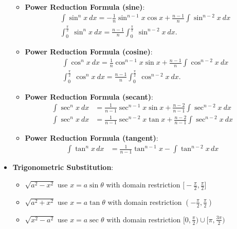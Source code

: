\documentclass{report}
\begin{document}
\begin{itemize}
\begin{itemize}
                \item \textbf{Power Reduction Formula (sine)}:
                    \begin{align*}
                        &\int \sin^{n}{x}\ dx = -\frac{1}{n}\sin^{n-1}{x}\cos{x} + \frac{n-1}{n}\int \sin^{n-2}{x}\ dx \\
                        &\int_{0}^{\frac{\pi}{2}}\ \sin^{n}{x}\ dx = \frac{n-1}{n}\int_{0}^{\frac{\pi}{2}}\ \sin^{n-2}{x}\ dx
                    .\end{align*}
                \item \textbf{Power Reduction Formula (cosine)}:
                    \begin{align*}
                        &\int \cos^{n}{x}\ dx = \frac{1}{n}\cos^{n-1}{x}\sin{x} + \frac{n-1}{n}\int \cos^{n-2}{x}\ dx \\
                        &\int_{0}^{\frac{\pi}{2}}\ \cos^{n}{x}\ dx = \frac{n-1}{n}\int_{0}^{\frac{\pi}{2}}\ \cos^{n-2}{x}\ dx
                    .\end{align*}
                \item \textbf{Power Reduction Formula (secant)}:
                    \begin{align*}
                        \int \sec^{n}{x}\ dx &= \frac{1}{n-1}\sec^{n-1}{x}\sin{x}+\frac{n-2}{n-1}\int \sec^{n-2}{x}\ dx \\
                        \int \sec^{n}{x}\ dx &= \frac{1}{n-1}\sec^{n-2}{x}\tan{x}+\frac{n-2}{n-1}\int \sec^{n-2}{x}\ dx
                    \end{align*}

                \item \textbf{Power Reduction Formula (tangent)}:
                    \begin{align*}
                        \int \tan^n x \, dx &= \frac{1}{n-1} \tan^{n-1}x - \int \tan^{n-2}x \, dx
                    \end{align*}
            \end{itemize}
        \item \textbf{Trigonometric Substitution}:
            \begin{itemize}
                \item $\sqrt{a^{2} - x^{2}}$ use $x =a\sin{\theta }$ with domain restriction $\bigg[-\frac{\pi}{2},\frac{\pi}{2}\bigg] $
                \item $\sqrt{a^{2} + x^{2}}$ use $x=a\tan{\theta}$ with domain restriction $\left(-\frac{\pi}{2}, \frac{\pi}{2}\right)$
                \item $\sqrt{x^{2} - a^{2}}$ use $x =a\sec{\theta}$ with domain restriction $\bigg[0,\frac{\pi}{2}\bigg) \cup \bigg[\pi,\frac{3\pi}{2}\bigg)$ 
            \end{itemize}


\end{itemize}
\end{document}

